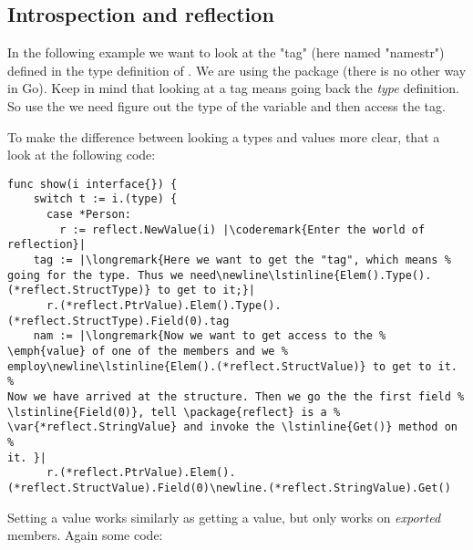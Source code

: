 \subsection{Introspection and reflection}
In the following example we want to look at the "tag" (here named
"namestr") defined in the
type definition of . We are using the
 package (there is no other way in Go). Keep in mind
that looking at a tag means going back the \emph{type} definition. So
use the  we need figure out the type of the variable
and then access the tag.



\showremarks

To make the difference between looking a types and values more clear,
that a look at the following code:
\begin{lstlisting}[caption=Reflection and the type and value]
func show(i interface{}) {
    switch t := i.(type) {
      case *Person:
        r := reflect.NewValue(i) |\coderemark{Enter the world of reflection}|
	tag := |\longremark{Here we want to get the "tag", which means %
going for the type. Thus we need\newline\lstinline{Elem().Type().(*reflect.StructType)} to get to it;}|
	  r.(*reflect.PtrValue).Elem().Type().(*reflect.StructType).Field(0).tag
	nam := |\longremark{Now we want to get access to the %
\emph{value} of one of the members and we %
employ\newline\lstinline{Elem().(*reflect.StructValue)} to get to it. %
Now we have arrived at the structure. Then we go the the first field %
\lstinline{Field(0)}, tell \package{reflect} is a %
\var{*reflect.StringValue} and invoke the \lstinline{Get()} method on %
it. }|
	  r.(*reflect.PtrValue).Elem().(*reflect.StructValue).Field(0)\newline.(*reflect.StringValue).Get()
\end{lstlisting}
\showremarks
Setting a value works similarly as getting a value, but only works on
\emph{exported} members. Again some code:

